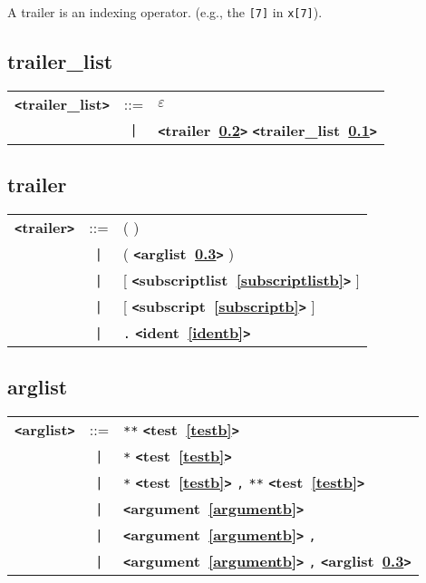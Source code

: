\documentclass[12pt]{article}
\begin{document}
A trailer is an indexing operator.  (e.g., the \verb|[7]| in \verb|x[7]|).

\subsection{trailer\_list}
\label{trailerzzzlistb}
\begin{tabular}{lcl}
{\bf \verb+<+trailer\_list\verb+>+} & ::=  & $\varepsilon$ \\
 & \verb+|+  & {\bf \verb+<+trailer~\ref{trailerb}\verb+>+}  {\bf \verb+<+trailer\_list~\ref{trailerzzzlistb}\verb+>+}  \\
\end{tabular}

\subsection{trailer}
\label{trailerb}
\begin{tabular}{lcl}
{\bf \verb+<+trailer\verb+>+} & ::=  & ( ) \\
 & \verb+|+  & ( {\bf \verb+<+arglist~\ref{arglistb}\verb+>+}  ) \\
 & \verb+|+  & [ {\bf \verb+<+subscriptlist~\ref{subscriptlistb}\verb+>+}  ] \\
 & \verb+|+  & [ {\bf \verb+<+subscript~\ref{subscriptb}\verb+>+}  ] \\
 & \verb+|+  & \verb|.| {\bf \verb+<+ident~\ref{identb}\verb+>+}  \\
\end{tabular}

\subsection{arglist}
\label{arglistb}
\begin{tabular}{lcl}
{\bf \verb+<+arglist\verb+>+} & ::=  & \verb|**| {\bf \verb+<+test~\ref{testb}\verb+>+}  \\
 & \verb+|+  & \verb|*| {\bf \verb+<+test~\ref{testb}\verb+>+}  \\
 & \verb+|+  & \verb|*| {\bf \verb+<+test~\ref{testb}\verb+>+}  \verb|,| \verb|**| {\bf \verb+<+test~\ref{testb}\verb+>+}  \\
 & \verb+|+  & {\bf \verb+<+argument~\ref{argumentb}\verb+>+}  \\
 & \verb+|+  & {\bf \verb+<+argument~\ref{argumentb}\verb+>+}  \verb|,| \\
 & \verb+|+  & {\bf \verb+<+argument~\ref{argumentb}\verb+>+}  \verb|,| {\bf \verb+<+arglist~\ref{arglistb}\verb+>+}  \\
\end{tabular}
\end{document}

